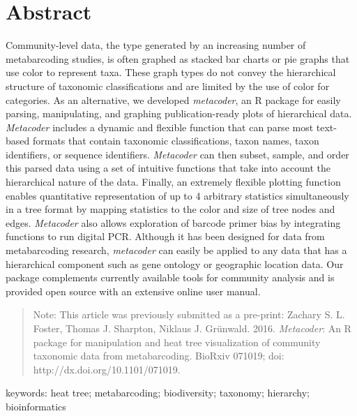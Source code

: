 \documentclass[10pt,letterpaper]{article}
\begin{document}
\section*{Abstract}
Community-level data, the type generated by an increasing number of
metabarcoding studies, is often graphed as stacked bar charts or pie
graphs that use color to represent taxa. These graph types do not convey
the hierarchical structure of taxonomic classifications and are limited
by the use of color for categories. As an alternative, we developed
\emph{metacoder}, an R package for easily parsing, manipulating, and
graphing publication-ready plots of hierarchical data. \emph{Metacoder}
includes a dynamic and flexible function that can parse most text-based
formats that contain taxonomic classifications, taxon names, taxon
identifiers, or sequence identifiers. \emph{Metacoder} can then subset,
sample, and order this parsed data using a set of intuitive functions
that take into account the hierarchical nature of the data. Finally, an
extremely flexible plotting function enables quantitative representation
of up to 4 arbitrary statistics simultaneously in a tree format by
mapping statistics to the color and size of tree nodes and edges.
\emph{Metacoder} also allows exploration of barcode primer bias by
integrating functions to run digital PCR. Although it has been designed
for data from metabarcoding research, \emph{metacoder} can easily be
applied to any data that has a hierarchical component such as gene
ontology or geographic location data. Our package complements currently
available tools for community analysis and is provided open source with
an extensive online user manual.

\begin{quote}
Note: This article was previously submitted as a pre-print: Zachary S.
L. Foster, Thomas J. Sharpton, Niklaus J. Grünwald. 2016.
\emph{Metacoder}: An R package for manipulation and heat tree
visualization of community taxonomic data from metabarcoding. BioRxiv
071019; doi: http://dx.doi.org/10.1101/071019.
\end{quote}

keywords: heat tree; metabarcoding; biodiversity; taxonomy; hierarchy;
bioinformatics



\end{document}
